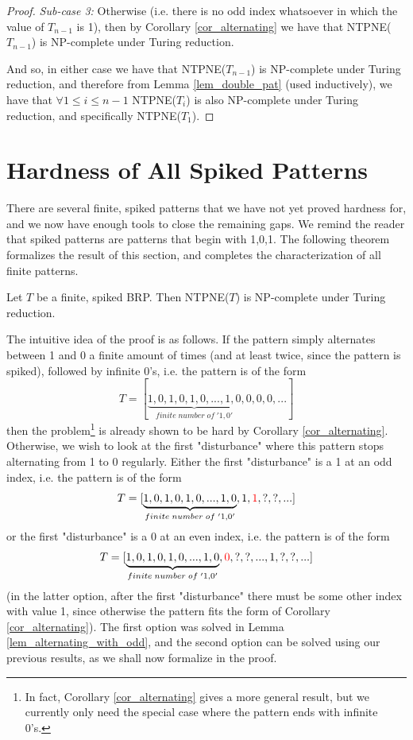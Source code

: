 \documentclass[runningheads]{llncs}
\begin{document}
\begin{proof}
 \textit{Sub-case 3:} Otherwise (i.e. there is no odd index whatsoever in which the value of $T_{n-1}$ is 1), then by Corollary \ref{cor_alternating} we have that NTPNE($T_{n-1}$) is NP-complete under Turing reduction.
 
 And so, in either case we have that NTPNE($T_{n-1}$) is NP-complete under Turing reduction, and therefore from Lemma \ref{lem_double_pat} (used inductively), we have that $\forall 1\leq i\leq n-1$ NTPNE($T_i$) is also NP-complete under Turing reduction, and specifically NTPNE($T_1$).
 \end{proof}

\section{Hardness of All Spiked Patterns}
\label{sec_all_spiked}
There are several finite, spiked patterns that we have not yet proved hardness for, and we now have enough tools to close the remaining gaps. We remind the reader that spiked patterns are patterns that begin with 1,0,1. The following theorem formalizes the result of this section, and completes the characterization of all finite patterns.

\begin{theorem}
\label{thrm_all_spiked}
Let $T$ be a finite, spiked BRP. Then NTPNE($T$) is NP-complete under Turing reduction.
\end{theorem}

The intuitive idea of the proof is as follows. If the pattern simply alternates between 1 and 0 a finite amount of times (and at least twice, since the pattern is spiked), followed by infinite 0's, i.e. the pattern is of the form
\[T=[\underbrace{1,0,1,0,1,0,...,1,0}_{finite\;number\;of\;'1,0'},0,0,0,...]\]
then the problem\footnote{In fact, Corollary \ref{cor_alternating} gives a more general result, but we currently only need the special case where the pattern ends with infinite 0's.} is already shown to be hard by Corollary \ref{cor_alternating}. Otherwise, we wish to look at the first "disturbance" where this pattern stops alternating from 1 to 0 regularly. Either the first "disturbance" is a 1 at an odd index, i.e. the pattern is of the form
\[
T=[\underbrace{1,0,1,0,1,0,...,1,0}_{finite\;number\;of\;'1,0'},1,\textcolor{red}{1},?,?,...]
\]
or the first "disturbance" is a 0 at an even index, i.e. the pattern is of the form
\[
T=[\underbrace{1,0,1,0,1,0,...,1,0}_{finite\;number\;of\;'1,0'},\textcolor{red}{0},?,?,...,1,?,?,...]
\]
(in the latter option, after the first "disturbance" there must be some other index with value 1, since otherwise the pattern fits the form of Corollary \ref{cor_alternating}). The first option was solved in Lemma \ref{lem_alternating_with_odd}, and the second option can be solved using our previous results, as we shall now formalize in the proof. 
\end{document}
